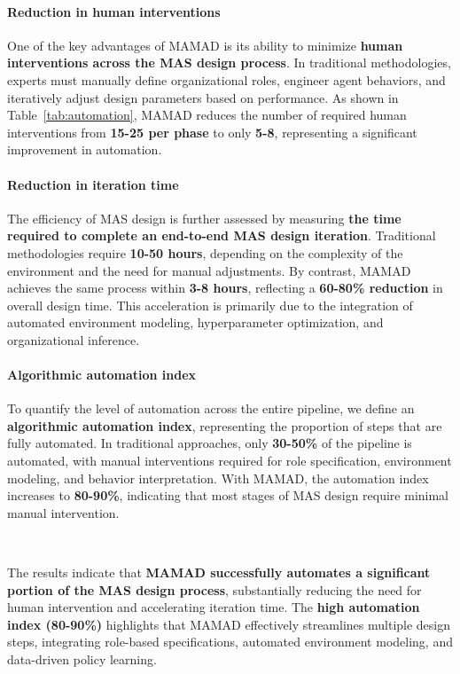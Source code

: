 \documentclass[pdflatex,sn-mathphys-num]{sn-jnl}%
\theoremstyle{thmstyleone}%
\theoremstyle{thmstyletwo}%
\theoremstyle{thmstylethree}%
\begin{document}
\paragraph{Reduction in human interventions}
One of the key advantages of MAMAD is its ability to minimize \textbf{human interventions across the MAS design process}. In traditional methodologies, experts must manually define organizational roles, engineer agent behaviors, and iteratively adjust design parameters based on performance. As shown in Table~\ref{tab:automation}, MAMAD reduces the number of required human interventions from \textbf{15-25 per phase} to only \textbf{5-8}, representing a significant improvement in automation.

\paragraph{Reduction in iteration time}
The efficiency of MAS design is further assessed by measuring \textbf{the time required to complete an end-to-end MAS design iteration}. Traditional methodologies require \textbf{10-50 hours}, depending on the complexity of the environment and the need for manual adjustments. By contrast, MAMAD achieves the same process within \textbf{3-8 hours}, reflecting a \textbf{60-80\% reduction} in overall design time. This acceleration is primarily due to the integration of automated environment modeling, hyperparameter optimization, and organizational inference.

\paragraph{Algorithmic automation index}
To quantify the level of automation across the entire pipeline, we define an \textbf{algorithmic automation index}, representing the proportion of steps that are fully automated. In traditional approaches, only \textbf{30-50\%} of the pipeline is automated, with manual interventions required for role specification, environment modeling, and behavior interpretation. With MAMAD, the automation index increases to \textbf{80-90\%}, indicating that most stages of MAS design require minimal manual intervention.

\

The results indicate that \textbf{MAMAD successfully automates a significant portion of the MAS design process}, substantially reducing the need for human intervention and accelerating iteration time. The \textbf{high automation index (80-90\%)} highlights that MAMAD effectively streamlines multiple design steps, integrating role-based specifications, automated environment modeling, and data-driven policy learning.
\end{document}
